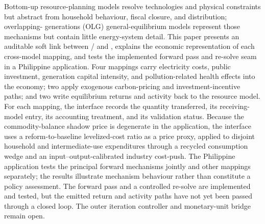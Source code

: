 Bottom-up resource-planning models resolve technologies and physical constraints but
abstract from household behaviour, fiscal closure, and distribution; overlapping-
generations (OLG) general-equilibrium models represent those mechanisms but contain
little energy-system detail. This paper presents an
auditable soft link between \CLEWS{}/\OSeMOSYS{} and \OGCore{}, explains the economic
representation of each cross-model mapping, and tests the implemented forward pass and
re-solve seam in a Philippine application. Four mappings carry electricity costs, public
investment, generation capital intensity, and pollution-related health effects into the
economy; two apply exogenous carbon-pricing and investment-incentive paths; and
two write equilibrium returns and activity back to the resource model. For each mapping,
the interface records the quantity transferred, its receiving-model entry, its accounting
treatment, and its validation status. Because the commodity-balance shadow price is degenerate in the
application, the interface uses a reform-to-baseline levelized-cost ratio as a price proxy,
applied to disjoint household and intermediate-use expenditures through a recycled
consumption wedge and an input--output-calibrated industry cost-push. The Philippine
application tests the principal forward mechanisms jointly and other mappings separately;
the results illustrate mechanism behaviour rather than constitute a policy assessment.
The forward pass and a controlled \CLEWS{} re-solve are implemented and tested, but the
emitted return and activity paths have not yet been passed through a closed loop. The
outer iteration controller and monetary-unit bridge remain open.
